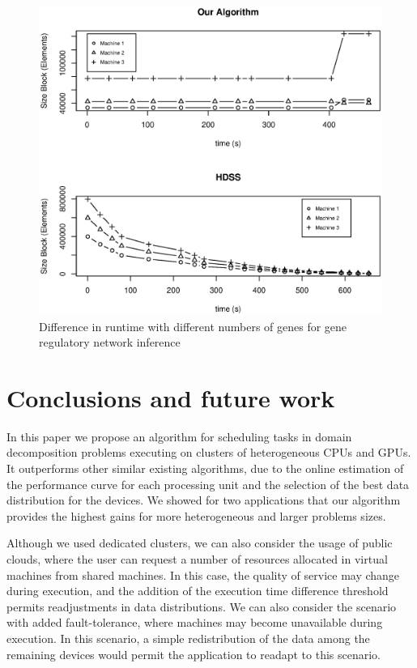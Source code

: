 \documentclass[journal]{IEEEtran}
\begin{document}
\begin{figure}[htb]
	\begin{center}
	\centering
			\includegraphics[scale=0.4]{BlocosComportamento_Fabrizio.eps}
	\caption{Difference in runtime with different numbers of genes for gene regulatory network inference}
	\label{fig:GeneBlocos}
	\end{center}
\end{figure}


\section{Conclusions and future work}

In this paper we propose an algorithm for scheduling tasks in domain
decomposition problems executing on clusters of heterogeneous CPUs and GPUs. It
outperforms other similar existing algorithms, due to the online estimation of
the performance curve for each processing unit and the selection of the best
data distribution for the devices. We showed for two applications that our
algorithm provides the highest gains for more heterogeneous and larger problems
sizes.

Although we used dedicated clusters, we can also consider the usage of public
clouds, where the user can request a number of resources allocated in virtual
machines from shared machines. In this case, the quality of service may change
during execution, and the addition of the execution time difference threshold
permits readjustments in data distributions. We can also consider the scenario
with added fault-tolerance, where machines may become unavailable during
execution. In this scenario, a simple redistribution of the data among the
remaining devices would permit the application to readapt to this scenario.
\end{document}
